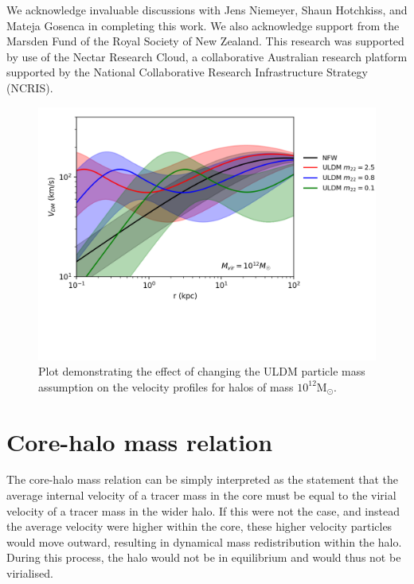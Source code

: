 \documentclass{pasa}%
\begin{document}
\begin{acknowledgements}
We acknowledge invaluable discussions with Jens Niemeyer, Shaun Hotchkiss, and Mateja Gosenca in completing this work. We also acknowledge support from the Marsden Fund of the Royal Society of New Zealand. This research was supported by use of the Nectar Research Cloud, a collaborative Australian research platform supported by the National Collaborative Research Infrastructure Strategy (NCRIS).

\end{acknowledgements}



\begin{appendix}

\begin{figure}[t]
\centering
\includegraphics[scale = 0.8, trim={0cm 2.5cm 1cm 0cm}]{000_comp_10_12.png} 
\caption{Plot demonstrating the effect of changing the ULDM particle mass assumption on the velocity profiles for halos of mass $10^{12}\mathrm{M}_{\odot}$.}\label{fig:vel_5_10_11}
\end{figure}

\section{Core-halo mass relation}\label{app:core-halo}

 The core-halo mass relation can be simply interpreted as the statement that the average internal velocity of a tracer mass in the core must be equal to the virial velocity of a tracer mass in the wider halo. If this were not the case, and instead the average velocity were higher within the core, these higher velocity particles would move outward, resulting in dynamical mass redistribution within the halo. During this process, the halo would not be in equilibrium and would thus not be virialised.


\end{appendix}
\end{document}
